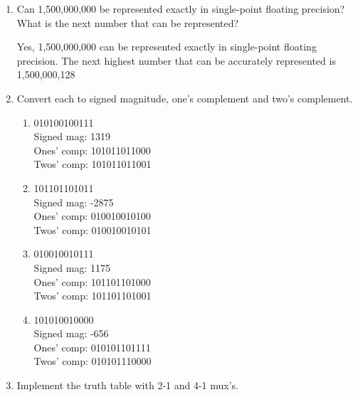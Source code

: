 \documentclass[12pt,letterpaper]{article}
\begin{document}
\begin{enumerate}
    \item
      Can 1,500,000,000 be represented exactly in single-point floating precision?
      What is the next number that can be represented?

      Yes, 1,500,000,000 can be represented exactly in single-point floating precision.
      The next highest number that can be accurately represented is 1,500,000,128

    \item
      Convert each to signed magnitude, one's complement and two's complement.

      \begin{enumerate}
        \item 010100100111 \\
          Signed mag: 1319 \\
          Ones' comp: 101011011000 \\
          Twos' comp: 101011011001

        \item 101101101011 \\
          Signed mag: -2875 \\
          Ones' comp: 010010010100 \\
          Twos' comp: 010010010101

        \item 010010010111 \\
          Signed mag: 1175 \\
          Ones' comp: 101101101000 \\
          Twos' comp: 101101101001

        \item 101010010000 \\
          Signed mag: -656 \\
          Ones' comp: 010101101111 \\
          Twos' comp: 010101110000

      \end{enumerate}
    \item
      Implement the truth table with 2-1 and 4-1 mux's.

\end{enumerate}
\end{document}
